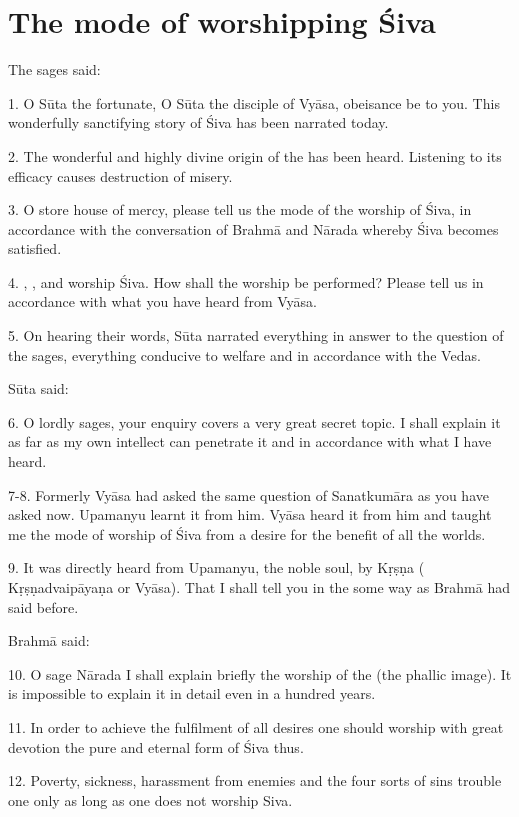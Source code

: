 \chapter{The mode of worshipping Śiva}

The sages said:

1. O Sūta the fortunate, O Sūta the disciple of Vyāsa, obeisance be to you. This
wonderfully sanctifying story of Śiva has been narrated today.

2. The wonderful and highly divine origin of the  has been heard.
Listening to its efficacy causes destruction of misery.

3. O store house of mercy, please tell us the mode of the worship of Śiva, in
accordance with the conversation of Brahmā and Nārada whereby Śiva becomes
satisfied.

4. , ,  and  worship Śiva.
How shall the worship be performed? Please tell us in accordance with what you
have heard from Vyāsa.

5. On hearing their words, Sūta narrated everything in answer to the question of
the sages, everything conducive to welfare and in accordance with the Vedas.

Sūta said:

6. O lordly sages, your enquiry covers a very great secret topic. I shall
explain it as far as my own intellect can penetrate it and in accordance with
what I have heard.

7-8. Formerly Vyāsa had asked the same question of Sanatkumāra as you have asked
now. Upamanyu learnt it from him. Vyāsa heard it from him and taught me the mode
of worship \etc of Śiva from a desire for the benefit of all the worlds.

9. It was directly heard from Upamanyu, the noble soul, by Kṛṣṇa (\ie
Kṛṣṇadvaipāyaṇa or Vyāsa). That I shall tell you in the some way as Brahmā had
said before.

Brahmā said:

10. O sage Nārada I shall explain briefly the worship of the 
(the phallic image). It is impossible to explain it in detail even in a hundred
years.

11. In order to achieve the fulfilment of all desires one should worship with
great devotion the pure and eternal form of Śiva thus.

12. Poverty, sickness, harassment from enemies and the four sorts of sins
trouble one only as long as one does not worship Siva.

